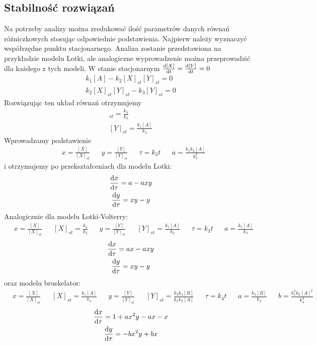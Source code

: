 \documentclass[10pt, a4paper, twoside, onecolumn]{article}
\numberwithin{equation}{section}
\begin{document}
	\subsection{Stabilność rozwiązań}
	Na potrzeby analizy można zredukować ilość parametrów danych równań różniczkowych stosując odpowiednie podstawienia. Najpierw należy wyznaczyć współrzędne punktu stacjonarnego. Analiza zostanie przedstawiona na przykładzie modelu Lotki, ale analogiczne wyprowadzenie można przeprowadzić dla każdego z tych modeli. W stanie stacjonarnym \(\dv{[X]}{t}=\dv{[Y]}{t}=0\)
	\begin{gather}
		k_{1}[A]-k_{2}[X]_{st}[Y]_{st}=0 \\
		k_{2}[X]_{st}[Y]_{st}-k_{3}[Y]_{st}=0
	\end{gather}
	Rozwiązując ten układ równań otrzymujemy
	\begin{gather}
		[X]_{st}=\frac{k_{3}}{k_{2}} \\
		[Y]_{st}=\frac{k_{1}[A]}{k_{3}}
	\end{gather}
	Wprowadzamy podstawienie
	\begin{align*}
		& x=\frac{[X]}{[X]_{st}} && y=\frac{[Y]}{[Y]_{st}} && \tau=k_{3}t && a=\frac{k_{1}k_{2}[A]}{k_{3}^{2}}
	\end{align*}
	i otrzymujemy po przekształceniach dla modelu Lotki:
	\begin{gather}
		\dv{x}{\tau}=a-axy \\
		\dv{y}{\tau}=xy-y
	\end{gather}
	Analogicznie dla modelu Lotki-Volterry:
	\begin{align}
		& x=\frac{[X]}{[X]_{st}} && [X]_{st} = \frac{k_{3}}{k_{2}} && y=\frac{[Y]}{[Y]_{st}} && [Y]_{st} = \frac{k_{1}[A]}{k_{2}} && \tau=k_{3}t && a=\frac{k_{1}[A]}{k_{3}}
	\end{align}
	\begin{gather}
		\dv{x}{\tau}=ax-axy \\
		\dv{y}{\tau}=xy-y
	\end{gather}
	oraz modelu bruskelator:
	\begin{align}
		& x=\frac{[X]}{[X]_{st}} && [X]_{st} = \frac{k_{1}[A]}{k_{4}} && y=\frac{[Y]}{[Y]_{st}} && [Y]_{st} = \frac{k_{3}k_{4}[B]}{k_{1}k_{2}[A]} && \tau=k_{4}t && a=\frac{k_{3}[B]}{k_{4}} && b=\frac{k_{1}^{2}k_{2}[A]^{2}}{k_{4}^{3}}
	\end{align}
	\begin{gather}
		\dv{x}{\tau}=1+ax^{2}y-ax-x \\
		\dv{y}{\tau}=-bx^{2}y+bx
	\end{gather}
\end{document}
